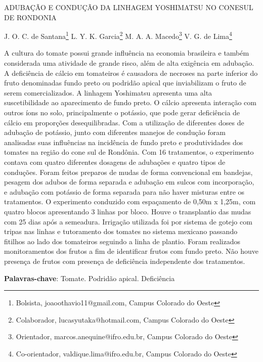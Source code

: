 \documentclass[article,12pt,onesidea,4paper,english,brazil]{abntex2}
\begin{document}
	
	
	\frenchspacing 
	
	\begin{center}
		\LARGE ADUBAÇÃO E CONDUÇÃO DA LINHAGEM YOSHIMATSU NO CONESUL DE RONDONIA
		
		\normalsize
		J. O. C. de Santana\footnote{Bolsista, joaoothavio11@gmail.com, Campus Colorado do Oeste} 
		L. Y. K. Garcia\footnote{Colaborador, lucasyutaka@hotmail.com, Campus Colorado do Oeste} 
		M. A. A. Macedo\footnote{Orientador, marcos.anequine@ifro.edu.br, Campus Colorado do Oeste} 
		V. G. de Lima\footnote{Co-orientador, valdique.lima@ifro.edu.br, Campus Colorado do Oeste} 
	\end{center}
	
	\noindent A cultura do tomate possui grande influência na economia brasileira e também considerada uma atividade de grande risco, além de alta exigência em adubação. A deficiência de cálcio em tomateiros é causadora de necroses na parte inferior do fruto denominadas fundo preto ou podridão apical que inviabilizam o fruto de serem comercializados. A linhagem Yoshimatsu apresenta uma alta suscetibilidade ao aparecimento de fundo preto. O cálcio apresenta interação com outros íons no solo, principalmente o potássio, que pode gerar deficiência de cálcio em proporções desequilibradas. Com a utilização de diferentes doses de adubação de potássio, junto com diferentes manejos de condução foram analisadas suas influências na incidência de fundo preto e produtividades dos tomates na região do cone sul de Rondônia. Com 16 tratamentos, o experimento contava com quatro diferentes dosagens de adubações e quatro tipos de conduções. Foram feitos preparos de mudas de forma convencional em bandejas, pesagem dos adubos de forma separada e adubação em sulcos com incorporação, e adubação com potássio de forma separada para não haver misturas entre os tratamentos. O experimento conduzido com espaçamento de 0,50m x 1,25m, com quatro blocos apresentando 3 linhas por bloco. Houve o transplantio das mudas com 25 dias após a semeadura. Irrigação utilizada foi por sistema de gotejo com tripas nas linhas e tutoramento dos tomates no sistema mexicano passando fitilhos ao lado dos tomateiros seguindo a linha de plantio. Foram realizados monitoramentos dos frutos a fim de identificar frutos com fundo preto. Não houve presença de frutos com presença de deficiência independente dos tratamentos.
	
	\vspace{\onelineskip}
	
	\noindent
	\textbf{Palavras-chave}: Tomate. Podridão apical. Deficiência
	
\end{document}
